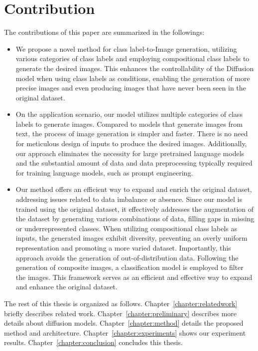 \section{Contribution}
The contributions of this paper are summarized in the followings:
\begin{itemize}
    \item We propose a novel method for class label-to-Image generation, utilizing various categories of class labels and employing compositional class labels to generate the desired images. This enhances the controllability of the Diffusion model when using class labels as conditions, enabling the generation of more precise images and even producing images that have never been seen in the original dataset.
    \item On the application scenario, our model utilizes multiple categories of class labels to generate images. Compared to models that generate images from text, the process of image generation is simpler and faster. There is no need for meticulous design of inputs to produce the desired images. Additionally, our approach eliminates the necessity for large pretrained language models and the substantial amount of data and data preprocessing typically required for training language models, such as prompt engineering.
    \item Our method offers an efficient way to expand and enrich the original dataset, addressing issues related to data imbalance or absence. Since our model is trained using the original dataset, it effectively addresses the augmentation of the dataset by generating various combinations of data, filling gaps in missing or underrepresented classes. When utilizing compositional class labels as inputs, the generated images exhibit diversity, preventing an overly uniform representation and promoting a more varied dataset. Importantly, this approach avoids the generation of out-of-distribution data. Following the generation of composite images, a classification model is employed to filter the images. This framework serves as an efficient and effective way to expand and enhance the original dataset.
\end{itemize}

The rest of this thesis is organized as follows. Chapter~\ref{chapter:relatedwork} briefly describes related work. Chapter~\ref{chapter:preliminary} describes more details about diffusion models. Chapter~\ref{chapter:method} details the proposed method and architecture. Chapter~\ref{chapter:experiments} shows our experiment results. Chapter~\ref{chapter:conclusion} concludes this thesis.


